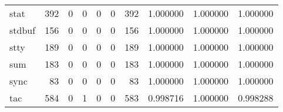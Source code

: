 \begin{longtable}{lrrrrrrrrr}
stat      &                                   392 &                                                  0 &                                                  0 &                                                  0 &                                                  0 &                                                392 &                                           1.000000 &                               1.000000 &                             1.000000 \\
stdbuf    &                                   156 &                                                  0 &                                                  0 &                                                  0 &                                                  0 &                                                156 &                                           1.000000 &                               1.000000 &                             1.000000 \\
stty      &                                   189 &                                                  0 &                                                  0 &                                                  0 &                                                  0 &                                                189 &                                           1.000000 &                               1.000000 &                             1.000000 \\
sum       &                                   183 &                                                  0 &                                                  0 &                                                  0 &                                                  0 &                                                183 &                                           1.000000 &                               1.000000 &                             1.000000 \\
sync      &                                    83 &                                                  0 &                                                  0 &                                                  0 &                                                  0 &                                                 83 &                                           1.000000 &                               1.000000 &                             1.000000 \\
tac       &                                   584 &                                                  0 &                                                  1 &                                                  0 &                                                  0 &                                                583 &                                           0.998716 &                               1.000000 &                             0.998288 \\

\end{longtable}
